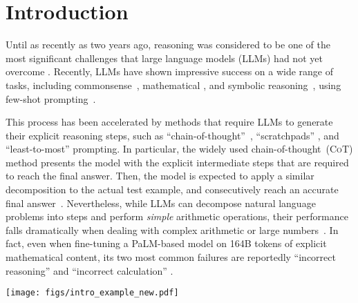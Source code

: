 \documentclass[dvipsnames]{article} \usepackage[accepted]{icml2022}
\newcommand{\ours}{\textsc{PaL}\xspace}
\newcommand{\cotp}{\textsc{CoT}\xspace}
\newcommand{\llms}{LLMs\xspace}
\begin{document}
 





\section{Introduction}
\label{sec:intro}

Until as recently as two years ago, reasoning was considered to be one of the most significant challenges that large language models (LLMs) had not yet overcome \citep{marcus2018deep, marcus2020next, garcez2020neurosymbolic}.
Recently, \llms have
shown impressive success on a wide range of tasks, including commonsense~\citep{flan,bigscience,cocogen}, mathematical \citep{minerva,wu2022autoformalization,Mishra2022Lila}, and symbolic reasoning~\citep{yao2022react,ahn2022can},  
using few-shot prompting~\citep{brown2020language}.

This process has been accelerated by methods that require LLMs to generate their explicit reasoning steps, such as ``chain-of-thought''~\citep{wei2022chain}, ``scratchpads'' \citep{scratchpad2021}, and ``least-to-most'' \citep{zhou2022least} prompting. 
In particular, the widely used chain-of-thought~(\cotp) method presents the model with the explicit intermediate steps that are required to reach the final answer. 
Then, the model is expected to apply a similar decomposition to the actual test example, and consecutively reach an accurate final answer~\citep{ling2017program,amini-etal-2019-mathqa}.
Nevertheless, while LLMs can decompose natural language problems into steps and perform \emph{simple} arithmetic operations, their performance falls dramatically when dealing with complex arithmetic \citep{hendrycks2021measuring,cotanalysis2022} or large numbers~\citep{nogueira2021investigating,qian2022limitations}. 
In fact, even when fine-tuning a PaLM-based model on 164B tokens of explicit mathematical content, its two most common failures are reportedly ``incorrect reasoning'' and ``incorrect calculation'' \citep{minerva}. 


\begin{figure*}[t]
\centering
\texttt{[image: figs/intro\_example\_new.pdf]}
\caption{A diagram illustrating \ours: Given a mathematical reasoning question,
Chain-of-thought (left) generates intermediate reasoning steps of free-form text. In contrast, Program-aided Language models~(\ours, right) generate intermediate steps \emph{and} Python code. This shifts the role of \emph{running} the reasoning steps from the language model to the Python interpreter. 
The final answer is obtained by running the generated reasoning chain.
Chain-of-thought reasoning is \colorbox{cotcolor}{highlighted in blue}; \ours steps are  \colorbox{parcolorback}{\color{parcolortext}\texttt{\textbf{highlighted in gray and pink}}}; the Python interpreter run is \colorbox{black}{\color{green}highlighted in black and green}.
}
\label{fig:mainfigure}
\end{figure*}
\end{document}
